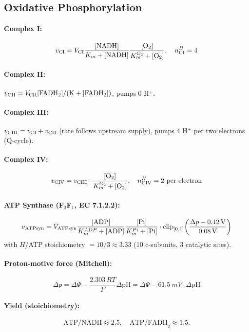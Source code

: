 \documentclass[11pt,a4paper]{article}
\newcommand{\eq}[1]{\begin{equation}#1\end{equation}}
\begin{document}
\subsection{Oxidative Phosphorylation}

\paragraph{Complex I:}
\eq{ v_{\rm CI} = V_{\rm CI}\frac{[\rm NADH]}{K_m+[\rm NADH]}\frac{[\rm O_2]}{K_m^{O_2}+[\rm O_2]},\quad n^H_{\rm CI}=4 }

\paragraph{Complex II:} $v_{\rm CII}=V_{\rm CII}[\rm FADH_2]/(K+[\rm FADH_2])$, pumps 0 H$^+$.

\paragraph{Complex III:} $v_{\rm CIII}=v_{\rm CI}+v_{\rm CII}$ (rate follows upstream supply), pumps 4 H$^+$ per two electrons (Q-cycle).

\paragraph{Complex IV:}
\eq{ v_{\rm CIV} = v_{\rm CIII}\cdot\frac{[\rm O_2]}{K_m^{O_2}+[\rm O_2]},\quad n^H_{\rm CIV}=2\ \text{per electron} }

\paragraph{ATP Synthase (F$_0$F$_1$, EC 7.1.2.2):}
\eq{ v_{\rm ATPsyn} = V_{\rm ATPsyn}\frac{[\rm ADP]}{K_m^{ADP}+[\rm ADP]}\frac{[\rm Pi]}{K_m^{Pi}+[\rm Pi]}\cdot\mathrm{clip}_{[0,1]}\!\left(\frac{\Delta p - 0.12\,\mathrm V}{0.08\,\mathrm V}\right) }
with $H$/ATP stoichiometry $= 10/3 \approx 3.33$ (10 c-subunits, 3 catalytic sites).

\paragraph{Proton-motive force (Mitchell):}
\eq{ \Delta p = \Delta\Psi - \frac{2.303\,RT}{F}\Delta\mathrm{pH} = \Delta\Psi - \SI{61.5}{mV}\cdot\Delta\mathrm{pH} }

\paragraph{Yield (stoichiometry):}
\[ \text{ATP/NADH}\approx 2.5,\quad \text{ATP/FADH}_2\approx 1.5. \]
\end{document}
